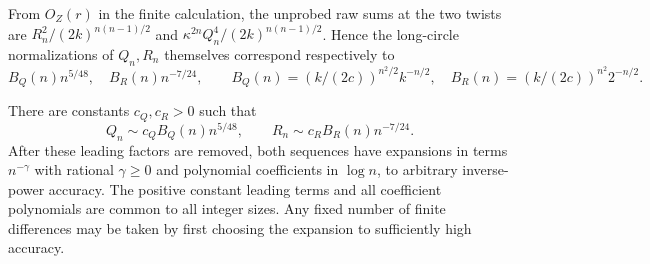 From \(O_Z(r)\) in the finite calculation, the unprobed raw sums at the two twists are \(R_n^2/(2k)^{n(n-1)/2}\) and \(\kappa^{2n}Q_n^4/(2k)^{n(n-1)/2}\). Hence the long-circle normalizations of \(Q_n,R_n\) themselves correspond respectively to
\[
 B_Q(n)n^{5/48},\quad B_R(n)n^{-7/24},\qquad
 B_Q(n)=(k/(2c))^{n^2/2}k^{-n/2},\quad B_R(n)=(k/(2c))^{n^2}2^{-n/2}.
\]
\begin{proposition}\label{L:prop:positive-normalization}
There are constants $c_Q,c_R>0$ such that
\[
 Q_n\sim c_Q B_Q(n)n^{5/48},\qquad
 R_n\sim c_R B_R(n)n^{-7/24}.
\]
After these leading factors are removed, both sequences have expansions
in terms $n^{-\gamma}$ with rational $\gamma\ge0$ and polynomial
coefficients in $\log n$, to arbitrary inverse-power accuracy. The positive
constant leading terms and all coefficient polynomials are common to all
integer sizes. Any fixed number of finite differences may be taken by
first choosing the expansion to sufficiently high accuracy.
\end{proposition}
